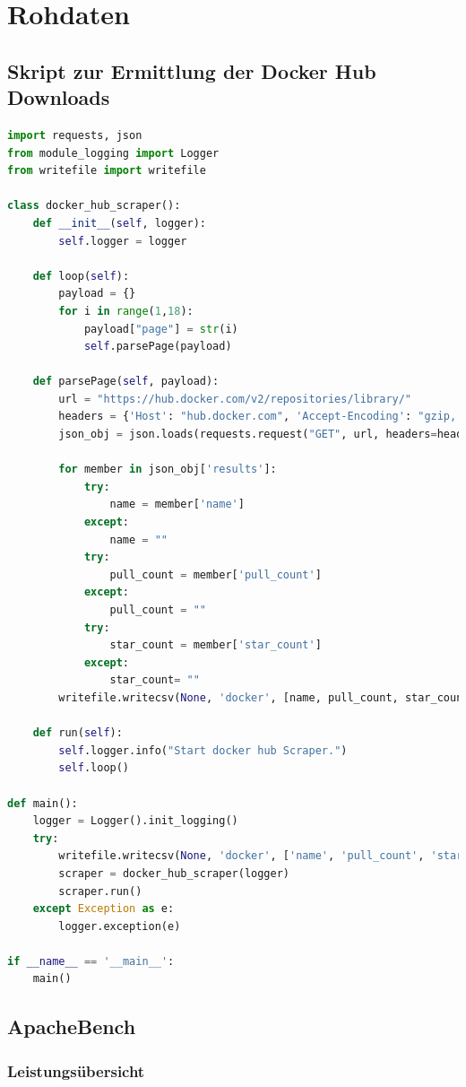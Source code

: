 \chapter{Rohdaten}

\section{Skript zur Ermittlung der Docker Hub Downloads}

\begin{lstlisting}[language=Python,frame=tb,caption=Skript zur Ermittlung der Docker Hub Downloads,captionpos=b,label=lst:dockerhubscript]
import requests, json
from module_logging import Logger
from writefile import writefile

class docker_hub_scraper():
	def __init__(self, logger):
		self.logger = logger
		
	def loop(self):
		payload = {}
		for i in range(1,18):
			payload["page"] = str(i)
			self.parsePage(payload)
		
	def parsePage(self, payload):
		url = "https://hub.docker.com/v2/repositories/library/"
		headers = {'Host': "hub.docker.com", 'Accept-Encoding': "gzip, deflate"}
		json_obj = json.loads(requests.request("GET", url, headers=headers, params=payload).text)
		
		for member in json_obj['results']:
			try:
				name = member['name']
			except:
				name = ""
			try:
				pull_count = member['pull_count']
			except:
				pull_count = ""
			try: 
				star_count = member['star_count']
			except:
				star_count= ""
		writefile.writecsv(None, 'docker', [name, pull_count, star_count])
	
	def run(self):
		self.logger.info("Start docker hub Scraper.")
		self.loop()

def main():
	logger = Logger().init_logging()
	try:
		writefile.writecsv(None, 'docker', ['name', 'pull_count', 'star_count'])
		scraper = docker_hub_scraper(logger)
		scraper.run()
	except Exception as e:
		logger.exception(e)

if __name__ == '__main__':
	main()
\end{lstlisting}
\newpage

\section{ApacheBench}
\subsection{Leistungsübersicht}

